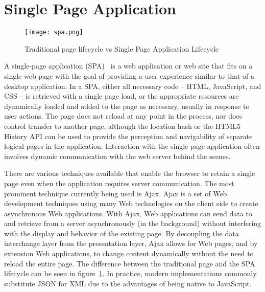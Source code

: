 \section{Single Page Application}
\label{spa}
\begin{figure}
	\centerline{\texttt{[image: spa.png]}}
	\caption{Traditional page lifecycle vs Single Page Application Lifecycle}
	\label{spa}
\end{figure}
A single-page application (SPA)~\cite{mikowski2013single} is a web application or web site that fits on a single web page with the goal of providing a user experience similar to that of a desktop application. In a SPA, either all necessary code – HTML, JavaScript, and CSS – is retrieved with a single page load, or the appropriate resources are dynamically loaded and added to the page as necessary, usually in response to user actions. The page does not reload at any point in the process, nor does control transfer to another page, although the location hash or the HTML5 History API can be used to provide the perception and navigability of separate logical pages in the application. Interaction with the single page application often involves dynamic communication with the web server behind the scenes.\par
	There are various techniques available that enable the browser to retain a single page even when the application requires server communication. The most prominent technique currently being used is Ajax. Ajax is a set of Web development techniques using many Web technologies on the client side to create asynchronous Web applications. With Ajax, Web applications can send data to and retrieve from a server asynchronously (in the background) without interfering with the display and behavior of the existing page. By decoupling the data interchange layer from the presentation layer, Ajax allows for Web pages, and by extension Web applications, to change content dynamically without the need to reload the entire page. The difference between the traditional page and the SPA lifecycle can be seen in figure~\ref{spa}. In practice, modern implementations commonly substitute JSON for XML due to the advantages of being native to JavaScript.



